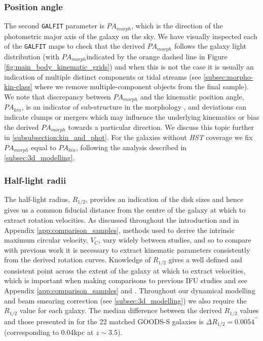 \documentclass[fleqn,usenatbib]{mn2e}
\begin{document}
\subsubsection{Position angle}\label{subsubsection:position_angle}
The second {\tt GALFIT} parameter is $PA_{morph}$, which is the direction of the photometric major axis of the galaxy on the sky.
We have visually inspected each of the {\tt GALFIT} maps to check that the derived $PA_{morph}$ follows the galaxy light distribution (with $PA_{morph}$indicated by the orange dashed line in Figure \ref{fig:main_body_kinematic_grids}) and when this is not the case it is usually an indication of multiple distinct components or tidal streams (see \cref{subsec:morpho-kin-class} where we remove multiple-component objects from the final sample).
We note that discrepancy between $PA_{morph}$ and the kinematic position angle, $PA_{kin}$, is an indicator of sub-structure in the morphology \citep[e.g.][]{Queyrel2012,Wisnioski2015,Rodrigues2016}, and deviations can indicate clumps or mergers which may influence the underlying kinematics or bias the derived $PA_{morph}$ towards a particular direction.
We discuss this topic further in \cref{subsubsection:kin_and_phot}.
For the galaxies without {\em HST} coverage we fix $PA_{morph}$ equal to $PA_{kin}$, following the analysis described in \cref{subsec:3d_modelling}.


\subsubsection{Half-light radii}\label{subsubsection:half-light_radii}
The half-light radius, $R_{1/2}$, provides an indication of the disk sizes and hence gives us a common fiducial distance from the centre of the galaxy at which to extract rotation velocities.
As discussed throughout the introduction and in Appendix \ref{app:comparison_samples}, methods used to derive the intrinsic maximum circular velocity, $V_{C}$, vary widely between studies, and so to compare with previous work it is necessary to extract kinematic parameters consistently from the derived rotation curves.
Knowledge of $R_{1/2}$ gives a well defined and consistent point across the extent of the galaxy at which to extract velocities, which is important when making comparisons to previous IFU studies and see Appendix \ref{app:comparison_samples} and \citep[e.g.][]{ForsterSchreiber2009,Epinat2012,Wisnioski2015,Stott2016,Harrison2017,Swinbank2017}.
Throughout our dynamical modelling and beam smearing correction (see \cref{subsec:3d_modelling}) we also require the $R_{1/2}$ value for each galaxy.
The median difference between the derived $R_{1/2}$ values and those presented in \cite{VanderWel2012} for the 22 matched GOODS-S galaxies is $\Delta R_{1/2} = 0.0054^{\prime\prime}$ (corresponding to 0.04kpc at $z\sim3.5$).
\end{document}
